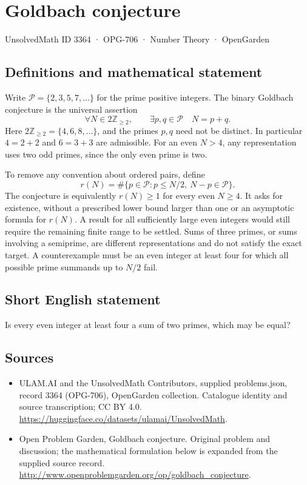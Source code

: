 \documentclass[11pt,a4paper]{article}
\begin{document}
\section*{Goldbach conjecture}\label{3364}
{\small UnsolvedMath ID 3364 · OPG-706 · Number Theory · OpenGarden}
\subsection{Definitions and mathematical statement}
Write $\mathcal P=\{2,3,5,7,\ldots\}$ for the prime positive integers.
The binary Goldbach conjecture is the universal assertion
\[
 \forall N\in2\mathbb Z_{\ge2},\qquad
                  \exists p,q\in\mathcal P\quad N=p+q.
\]
Here $2\mathbb Z_{\ge2}=\{4,6,8,\ldots\}$, and the primes $p,q$
need not be distinct. In particular $4=2+2$ and $6=3+3$ are admissible.
For an even $N>4$, any representation uses two odd primes, since
the only even prime is two.

To remove any convention about ordered pairs, define
\[
 r(N)=\#\{p\in\mathcal P:p\le N/2,\ N-p\in\mathcal P\}.
\]
The conjecture is equivalently $r(N)\ge1$ for every even $N\ge4$.
It asks for existence, without a prescribed lower bound larger than
one or an asymptotic formula for $r(N)$. A result for all sufficiently
large even integers would still require the remaining finite range
to be settled. Sums of three primes, or sums involving a semiprime,
are different representations and do not satisfy the exact target.
A counterexample must be an even integer at least four for which
all possible prime summands up to $N/2$ fail.
\subsection{Short English statement}
Is every even integer at least four a sum of two primes, which may be equal?
\subsection{Sources}
\begin{itemize}
\item[S1] ULAM.AI and the UnsolvedMath Contributors, supplied problems.json, record 3364 (OPG-706), OpenGarden collection. Catalogue identity and source transcription; CC BY 4.0.
\url{https://huggingface.co/datasets/ulamai/UnsolvedMath}.
\item[S2] Open Problem Garden, Goldbach conjecture. Original problem and discussion; the mathematical formulation below is expanded from the supplied source record.
\url{http://www.openproblemgarden.org/op/goldbach_conjecture}.
\end{itemize}
\end{document}

